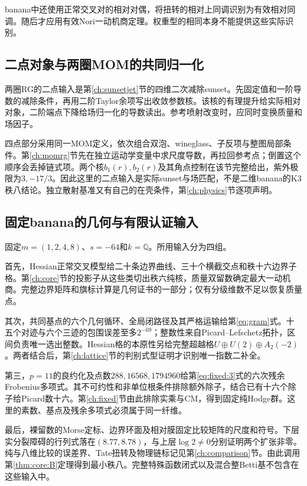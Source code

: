\documentclass[11pt,a4paper,oneside]{ctexart}
\theoremstyle{cnplain}
\theoremstyle{definition}
\theoremstyle{remark}
\numberwithin{equation}{section}
\begin{document}
banana中还使用正常交叉对的相对对偶，将扭转的相对上同调识别为有效相对同调。随后才应用有效Nori一动机商定理\cite{abv}。权重型的相同本身不能提供这些实际识别。

\subsection{二点对象与两圈MOM的共同归一化}
两圈RG的二点输入是第\ref{ch:sunsetjet}节的四维二次减除sunset。先固定值和一阶导数的减除条件，再用二阶Taylor余项写出收敛参数核。该核的有理提升给实际相对对象，二阶端点下降给场归一化的导数读出。参考喷射改变时，应同时变换质量和场因子。

四点部分采用同一MOM定义，依次组合双泡、wineglass、子反项与整图局部条件。第\ref{ch:momrg}节先在独立运动学变量中求尺度导数，再拉回参考点；倒置这个顺序会丢掉链式项。两个核$b_1(r),b_2(r)$及其角点控制在该节完整给出，紫外极限为$3,-17/3$。因此这里的二点输入是实际sunset与场匹配，不是二维banana的K3秩八结论。独立散射基准又有自己的在壳条件，第\ref{ch:physics}节逐项声明。

\subsection{固定banana的几何与有限认证输入}
固定$m=(1,2,4,8)$、$s=-64$和$k=\mathbb Q$。所用输入分为四组。

首先，Hessian正常交叉模型给二十条边界曲线、三十个横截交点和秩十六边界子格。第\ref{ch:core}节的投影子从这些类切出秩六纯核，质量双留数确定最大一动机商。完整边界矩阵和旗标计算是几何证书的一部分；仅有分级维数不足以恢复质量点。

其次，共同基点的六个几何循环、全局闭路径及其严格运输给第\ref{eq:gram}式。十五个对迹与六个三迹的包围误差至多$2^{-69}$；整数性来自Picard--Lefschetz拓扑，区间负责唯一选出整数。Hessian格的本原性另给完整超越格$U\oplus U(2)\oplus A_2(-2)$。两者结合后，第\ref{ch:lattice}节的判别式型证明才识别唯一指数二补全。

第三，$p=11$的良约化及点数$288,16568,1794960$给第\ref{eq:fixed:3}式的六次残余Frobenius多项式。其不可约性和非单位根条件排除额外除子，结合已有十六个除子给Picard数十六。第\ref{ch:fixed}节由此排除实乘与CM，得到固定纯Hodge群。这里的素数、基点及残余多项式必须属于同一纤维。

最后，裸留数的Morse定标、边界环面及相对膜固定比较矩阵的尺度和符号。下层实分裂障碍的行列式落在$(8.77,8.78)$，与上层$\log2\ne0$分别证明两个扩张非零。纯与八维比较的误差界、Tate扭转及物理链标记见第\ref{ch:comparison}节。由此调用第\ref{thm:core:B}定理得到最小秩八。完整特殊函数闭式以及混合整Betti基不包含在这些输入中。
\end{document}
